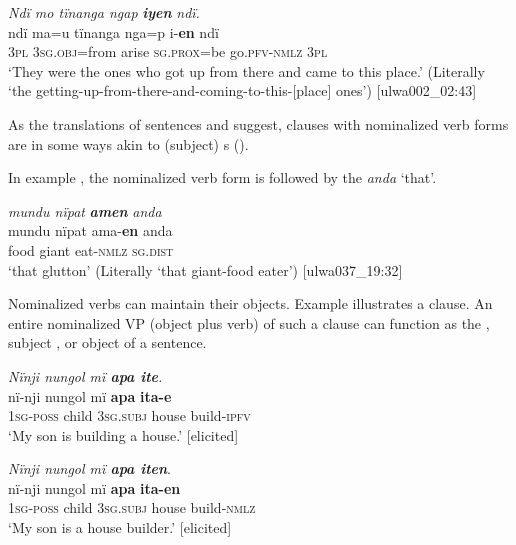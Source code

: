 \ea%
    \label{ex:nouns:19}

          \textit{Ndï mo tïnanga ngap} \textbf{\textit{iyen}} \textit{ndï.}\\
\gll    ndï  ma=u      tïnanga  nga=p       i-\textbf{en}      ndï\\
    3\textsc{pl}  3\textsc{sg.obj}=from  arise  \textsc{sg.prox}=be  go.\textsc{pfv-nmlz}  3\textsc{pl}\\
\glt `They were the ones who got up from there and came to this place.’ (Literally ‘the getting-up-from-there-and-coming-to-this-[place] ones’) [ulwa002\_02:43]
\z

As the translations of sentences  and  suggest, clauses with nominalized verb forms are in some ways akin to (subject) s ().

  In example , the nominalized verb form is followed by the   \textit{anda} ‘that’.

\ea%
    \label{ex:nouns:20}
          \textit{mundu nïpat} \textbf{\textit{amen}} \textit{anda}\\
\gll    mundu  nïpat  ama-\textbf{en}  anda\\
    food  giant  eat-\textsc{nmlz}  \textsc{sg.dist}\\
\glt `that glutton’ (Literally ‘that giant-food eater’) [ulwa037\_19:32]
\z

Nominalized  verbs can maintain their objects. Example  illustrates a  clause. An entire nominalized VP (object plus verb) of such a  clause can function as the  , subject , or object  of a sentence.

\ea%
    \label{ex:nouns:24}
          \textit{Nïnji nungol mï \textbf{apa ite}.}\\
\gll    nï-nji    nungol  mï      \textbf{apa}    \textbf{ita-e}\\
    \textsc{1sg-poss}  child  \textsc{3sg.subj}  house  build-\textsc{ipfv}\\
\glt `My son is building a house.’ [elicited]
\z

\ea%
    \label{ex:nouns:21}
          \textit{Nïnji nungol mï \textbf{apa iten}}.\\
\gll nï-nji    nungol  mï      \textbf{apa}  \textbf{ita-en}\\
    \textsc{1sg-poss}  child  \textsc{3sg.subj}  house  build-\textsc{nmlz}\\
\glt `My son is a house builder.’ [elicited]
\z

